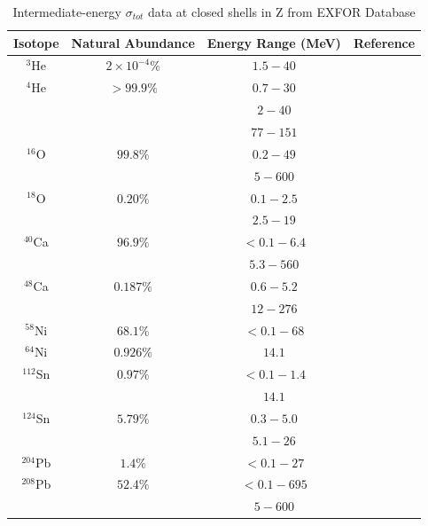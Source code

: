 \documentclass[twocolumn,secnumarabic,amssymb, nobibnotes, aps, prl,
superscriptaddress, nobalancelastpage]{revtex4}
\begin{document}
\begin{table}[ht]
    \caption{Intermediate-energy $\sigma_{tot}$ data at closed shells in Z from
    EXFOR Database}
    \label{IsotopeTable}
    \begin{center}
        \begin{tabular}{ c c c c }
            \hline
            Isotope & Natural Abundance & Energy Range (MeV) & Reference\\
            \hline

            $^{3}$He & $2\times 10^{-4}\%$ & $1.5 - 40$ & \cite{Haesner1983}\\
            $^{4}$He & $>99.9\%$ & $0.7-30$ & \cite{Goulding1973}\\
            & & $2-40$ & \cite{Haesner1983}\\
            & & $77-151$ & \cite{Measday1966}\\

            $^{16}$O & $99.8\%$ & $0.2-49$ & \cite{Perey1972}\\
            & & $5-600$ & \cite{Finlay1993}\\

            $^{18}$O & $0.20\%$ & $0.1-2.5$ & \cite{Vaughn1965}\\
            & & $2.5-19$ & \cite{Salisbury1965}\\

            $^{40}$Ca & $96.9\%$ & $<0.1-6.4$ & \cite{Johnson1973}\\
            & & $5.3-560$ & \cite{Abfalterer2001}\\

            $^{48}$Ca & $0.187\%$ & $0.6-5.2$ & \cite{Harvey1985}\\
            & & $12-276$ & \cite{Shane2010}\\

            $^{58}$Ni & $68.1\%$ & $<0.1-68$ & \cite{Perey1993,
        Perey1993TechReport, Perey1993ENDF}\\

            $^{64}$Ni & $0.926\%$ & $14.1$ & \cite{Dukarevich1967}\\

            $^{112}$Sn & $0.97\%$ & $<0.1-1.4$ & \cite{Timokhov1989}\\
            & & $14.1$ & \cite{Dukarevich1967}\\

            $^{124}$Sn & $5.79\%$ & $0.3-5.0$ & \cite{Harper1982}\\
            & & $5.1-26$ & \cite{Rapaport1980, Mirzaa1978}\\

            $^{204}$Pb & $1.4\%$ & $<0.1-27$ & \cite{Carlton2003}\\

            $^{208}$Pb & $52.4\%$ & $<0.1 - 695$ & \cite{Harvey1999}\\
            & & $5-600$ & \cite{Finlay1993}\\

            \hline
        \end{tabular}
    \end{center}
\end{table}
\end{document}
